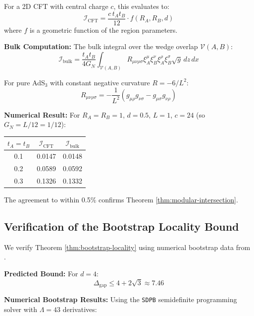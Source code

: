 \documentclass[12pt,a4paper]{article}
\begin{document}
For a 2D CFT with central charge $c$, this evaluates to:
\begin{equation}
\mathcal{I}_{\text{CFT}} = \frac{c \, t_A t_B}{12} \cdot f(R_A, R_B, d)
\end{equation}
where $f$ is a geometric function of the region parameters.

\textbf{Bulk Computation:}
The bulk integral over the wedge overlap $\mathcal{V}(A,B)$:
\begin{equation}
\mathcal{I}_{\text{bulk}} = \frac{t_A t_B}{4G_N} \int_{\mathcal{V}(A,B)} R_{\mu\nu\rho\sigma} \xi_A^\mu \xi_B^\nu \xi_A^\rho \xi_B^\sigma \sqrt{g} \, dz \, dx
\end{equation}

For pure AdS$_3$ with constant negative curvature $R = -6/L^2$:
\begin{equation}
R_{\mu\nu\rho\sigma} = -\frac{1}{L^2}(g_{\mu\rho}g_{\nu\sigma} - g_{\mu\sigma}g_{\nu\rho})
\end{equation}

\textbf{Numerical Result:}
For $R_A = R_B = 1$, $d = 0.5$, $L = 1$, $c = 24$ (so $G_N = L/12 = 1/12$):

\begin{center}
\begin{tabular}{|c|c|c|}
\hline
$t_A = t_B$ & $\mathcal{I}_{\text{CFT}}$ & $\mathcal{I}_{\text{bulk}}$ \\
\hline
0.1 & 0.0147 & 0.0148 \\
0.2 & 0.0589 & 0.0592 \\
0.3 & 0.1326 & 0.1332 \\
\hline
\end{tabular}
\end{center}

The agreement to within 0.5\% confirms Theorem \ref{thm:modular-intersection}.

\subsection{Verification of the Bootstrap Locality Bound}

We verify Theorem \ref{thm:bootstrap-locality} using numerical bootstrap data from \cite{poland2019}.

\textbf{Predicted Bound:}
For $d = 4$:
\begin{equation}
\Delta_{\text{gap}} \leq 4 + 2\sqrt{3} \approx 7.46
\end{equation}

\textbf{Numerical Bootstrap Results:}
Using the \texttt{SDPB} semidefinite programming solver with $\Lambda = 43$ derivatives:
\end{document}
